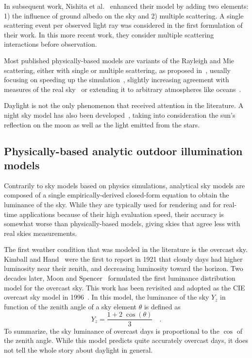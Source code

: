 In subsequent work, Nishita et al.~\cite{nishita1996display} enhanced their model by adding two elements: 1) the influence of ground albedo on the sky and 2) multiple scattering. A single scattering event per observed light ray was considered in the first formulation of their work. In this more recent work, they consider multiple scattering interactions before observation.

Most published physically-based models are variants of the Rayleigh and Mie scattering, either with single or multiple scattering, as proposed in~\cite{nishita1993display,nishita1996display}, usually focusing on speeding up the simulation~\cite{oneal2005accurate}, slightly increasing agreement with measures of the real sky~\cite{haber2005physically,bruneton2008precomputed} or extending it to arbitrary atmospheres like oceans~\cite{elek2010real}.

Daylight is not the only phenomenon that received attention in the literature. A night sky model has also been developed~\cite{jensen2001nightskymodel}, taking into consideration the sun's reflection on the moon as well as the light emitted from the stars.

\subsection{Physically-based analytic outdoor illumination models}

Contrarily to sky models based on physics simulations, analytical sky models are composed of a single empirically-derived closed-form equation to obtain the luminance of the sky. While they are typically used for rendering and for real-time applications because of their high evaluation speed, their accuracy is somewhat worse than physically-based models, giving skies that agree less with real skies measurements.

The first weather condition that was modeled in the literature is the overcast sky. Kimball and Hand~\cite{kimball1921sky} were the first to report in 1921 that cloudy days had higher luminosity near their zenith, and decreasing luminosity toward the horizon. Two decades later, Moon and Spencer~\cite{moon1942illumination} formulated the first luminance distribution model for the overcast sky. This work has been revisited and adopted as the CIE overcast sky model in 1996~\cite{cie1996s}. In this model, the luminance of the sky $Y_z$ in function of the zenith angle of a sky element $\theta$ is defined as
\begin{equation}
Y_z = \frac{1 + 2 \; \cos\left( \theta \right)}{3} \quad.
\end{equation}
To summarize, the sky luminance of overcast days is proportional to the $\cos$ of the zenith angle. While this model predicts quite accurately overcast days, it does not tell the whole story about daylight in general.

